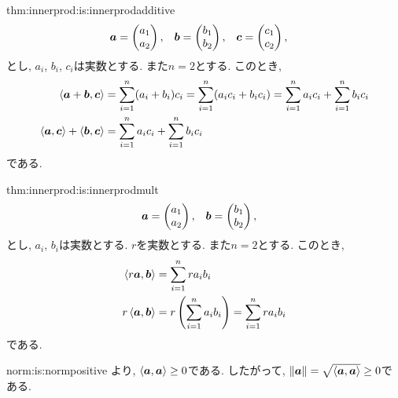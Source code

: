 \begin{proofof*}{thm:innerprod:is:innerprod}{additive}
  \begin{align*}
    \boldsymbol{a}&=\begin{pmatrix}a_1\\a_2\end{pmatrix},&
    \boldsymbol{b}&=\begin{pmatrix}b_1\\b_2\end{pmatrix},&
    \boldsymbol{c}&=\begin{pmatrix}c_1\\c_2\end{pmatrix},&
  \end{align*}
  とし,   $a_i$, $b_i$, $c_i$は実数とする.
  また$n=2$とする.
  このとき, 
  \begin{align*}
    \Braket{\boldsymbol{a}+\boldsymbol{b},\boldsymbol{c}}&=\sum_{i=1}^n (a_i+b_i)c_i=\sum_{i=1}^n (a_ic_i+b_ic_i)=\sum_{i=1}^n a_ic_i+\sum_{i=1}^nb_ic_i\\
    \Braket{\boldsymbol{a},\boldsymbol{c}}+\Braket{\boldsymbol{b},\boldsymbol{c}}&=\sum_{i=1}^n a_ic_i+\sum_{i=1}^nb_ic_i
  \end{align*}
  である.
\end{proofof*}

\begin{proofof*}{thm:innerprod:is:innerprod}{mult}
  \begin{align*}
    \boldsymbol{a}&=\begin{pmatrix}a_1\\a_2\end{pmatrix},&
    \boldsymbol{b}&=\begin{pmatrix}b_1\\b_2\end{pmatrix},&
  \end{align*}
  とし,   $a_i$, $b_i$は実数とする.
  $r$を実数とする.
  また$n=2$とする.
  このとき, 
  \begin{align*}
    \Braket{r\boldsymbol{a},\boldsymbol{b}}&=\sum_{i=1}^n ra_ib_i\\
    r\Braket{\boldsymbol{a},\boldsymbol{b}}&=r\left(\sum_{i=1}^n a_ib_i\right)=\sum_{i=1}^n ra_ib_i
  \end{align*}
  である.
\end{proofof*}

\begin{proofof*}{norm:is:norm}{positive}
  より, $\Braket{\boldsymbol{a},\boldsymbol{a}}\geq 0$である.
  したがって,
  $\|\boldsymbol{a}\|=\sqrt{\Braket{\boldsymbol{a},\boldsymbol{a}}}\geq 0$である.
\end{proofof*}

